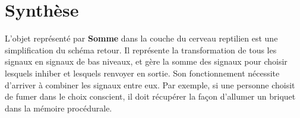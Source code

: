 \section{Synthèse}
L’objet représenté par \textbf{Somme} dans la couche du cerveau reptilien
est une simplification du schéma retour. Il représente la transformation de tous les
signaux en signaux de bas niveaux, et gère la somme des signaux pour choisir
lesquels inhiber et lesquels renvoyer en sortie. Son fonctionnement nécessite
d’arriver à combiner les signaux entre eux. Par exemple, si une personne choisit
de fumer dans le choix conscient, il doit récupérer la façon d’allumer un
briquet dans la mémoire procédurale.

